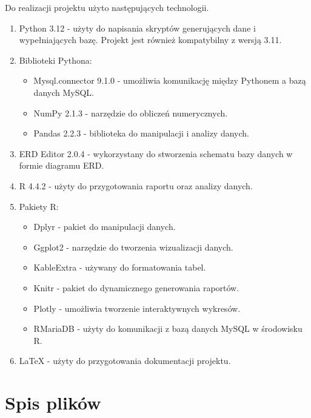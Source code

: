 \documentclass{article}
\begin{document}
	Do realizacji projektu użyto następujących technologii.
	\begin{enumerate}
		\item Python 3.12 - użyty do napisania skryptów generujących dane i wypełniających bazę. Projekt jest również kompatybilny z wersją 3.11.
		\item Biblioteki Pythona:
		\begin{itemize}
			\item Mysql.connector 9.1.0 - umożliwia komunikację między Pythonem a bazą danych MySQL.
			\item NumPy 2.1.3 - narzędzie do obliczeń numerycznych.
			\item Pandas 2.2.3 - biblioteka do manipulacji i analizy danych.
		\end{itemize}
		\item ERD Editor 2.0.4 - wykorzystany do stworzenia schematu bazy danych w formie diagramu ERD.
		\item R 4.4.2 - użyty do przygotowania raportu oraz analizy danych.
		\item Pakiety R:
		\begin{itemize}
			\item Dplyr - pakiet do manipulacji danych.
			\item Ggplot2 - narzędzie do tworzenia wizualizacji danych.
			\item KableExtra - używany do formatowania tabel.
			\item Knitr - pakiet do dynamicznego generowania raportów.
			\item Plotly - umożliwia tworzenie interaktywnych wykresów.
			\item RMariaDB - użyty do komunikacji z bazą danych MySQL w środowisku R.
		\end{itemize}
		\item LaTeX - użyty do przygotowania dokumentacji projektu.
	\end{enumerate}
	
	\section{Spis plików}
	
\end{document}
